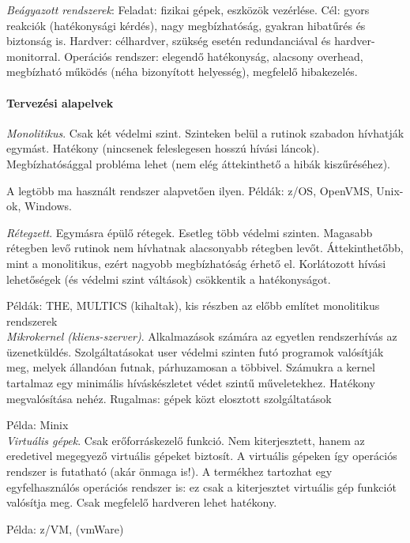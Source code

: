 \documentclass[fleqn,10pt,a4paper]{article}
\theoremstyle{magyar}
\begin{document}
  \emph{Beágyazott rendszerek}: Feladat: fizikai gépek, eszközök vezérlése. Cél: gyors reakciók (hatékonysági kérdés),
  nagy megbízhatóság, gyakran hibatűrés és biztonság is. Hardver: célhardver, szükség esetén redundanciával és
  hardver-monitorral. Operációs rendszer: elegendő hatékonyság, alacsony overhead, megbízható működés (néha bizonyított
  helyesség), megfelelő hibakezelés.
  

  \paragraph{Tervezési alapelvek}

  \emph{Monolitikus}. Csak két védelmi szint. Szinteken belül a rutinok szabadon hívhatják egymást. Hatékony (nincsenek
  feleslegesen hosszú hívási láncok). Megbízhatósággal probléma lehet (nem elég áttekinthető a hibák kiszűréséhez).
  
  A legtöbb ma használt rendszer alapvetően ilyen. Példák: z/OS, OpenVMS, Unix-ok, Windows.
  
  \emph{Rétegzett}. Egymásra épülő rétegek. Esetleg több védelmi szinten. Magasabb rétegben levő rutinok nem hívhatnak
  alacsonyabb rétegben levőt. Áttekinthetőbb, mint a monolitikus, ezért nagyobb megbízhatóság érhető el. Korlátozott
  hívási lehetőségek (és védelmi szint váltások) csökkentik a hatékonyságot.
  
  Példák: THE, MULTICS (kihaltak), kis részben az előbb említet monolitikus rendszerek\\

  \emph{Mikrokernel (kliens-szerver)}. Alkalmazások számára az egyetlen rendszerhívás az üzenetküldés. Szolgáltatásokat
  user védelmi szinten futó programok valósítják meg, melyek állandóan futnak, párhuzamosan a többivel. Számukra a
  kernel tartalmaz egy minimális híváskészletet védet szintű műveletekhez. Hatékony megvalósítása nehéz. Rugalmas: gépek
  közt elosztott szolgáltatások 
  
  Példa: Minix\\
  
  \emph{Virtuális gépek}. Csak erőforráskezelő funkció. Nem kiterjesztett, hanem az eredetivel megegyező virtuális
  gépeket biztosít. A virtuális gépeken így operációs rendszer is futatható (akár önmaga is!). A termékhez tartozhat egy
  egyfelhasználós operációs rendszer is: ez csak a kiterjesztet virtuális gép funkciót valósítja meg. Csak megfelelő
  hardveren lehet hatékony.
  
  Példa: z/VM, (vmWare)\\
\end{document}
